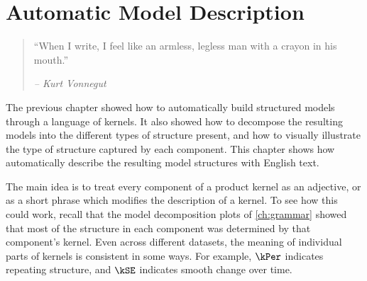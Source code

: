 
\inbpdocument


\chapter{Automatic Model Description}
\label{ch:description}










\begin{quotation}
``When I write, I feel like an armless, legless man with a crayon in his mouth.''

\hspace*{\fill} \emph{ -- Kurt Vonnegut}
\end{quotation}




The previous chapter showed how to automatically build structured models through a language of kernels.
It also showed how to decompose the resulting models into the different types of structure present, and how to visually illustrate the type of structure captured by each component.
This chapter shows how automatically describe the resulting model structures with English text.

The main idea is to treat every component of a product kernel as an adjective, or as a short phrase which modifies the description of a kernel.
To see how this could work, recall that the model decomposition plots of \cref{ch:grammar} showed that most of the structure in each component was determined by that component's kernel.
Even across different datasets, the meaning of individual parts of kernels is consistent in some ways.
For example, $\kPer$ indicates repeating structure, and $\kSE$ indicates smooth change over time.


